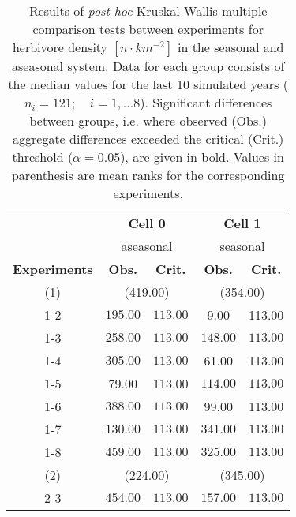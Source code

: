 \begin{table}[ht]
\centering
\small
\caption[Kruskal-Wallis multiple comparison of herbivore density.]{Results of \textit{post-hoc} Kruskal-Wallis multiple comparison
                            tests between experiments for herbivore density $[n\cdot km^{-2}]$ in the seasonal and aseasonal system.
                            Data for each group consists of the median values for the last 10 simulated years ($n_{i} = 121;\quad i = 1,\ldots8$).
                            Significant differences between groups, i.e. where observed (Obs.) aggregate differences exceeded the critical (Crit.) threshold ($\alpha = 0.05$), are given in bold. Values in parenthesis are mean ranks for the corresponding experiments.} 
\label{tab:chap:res:dyn:herbIND}
\begin{tabular*}{\textwidth}{@{\extracolsep{\fill} }ccccc}
  \toprule
& \multicolumn{2}{c}{\textbf{Cell 0}} & \multicolumn{2}{c}{\textbf{Cell 1}} \\
& \multicolumn{2}{c}{aseasonal} & \multicolumn{2}{c}{seasonal} \\
\cmidrule(lr){2-3} \cmidrule(lr){4-5}
\textbf{Experiments} & \textbf{Obs.} & \textbf{Crit.} & \textbf{Obs.} & \textbf{Crit.} \\
  \midrule
  (1) & \multicolumn{2}{c}{(419.00)} & \multicolumn{2}{c}{(354.00)} \\
1-2 & \(\mathbf{195.00}\) & \(\mathbf{113.00}\) & 9.00 & 113.00 \\ 
  1-3 & \(\mathbf{258.00}\) & \(\mathbf{113.00}\) & \(\mathbf{148.00}\) & \(\mathbf{113.00}\) \\ 
  1-4 & \(\mathbf{305.00}\) & \(\mathbf{113.00}\) & 61.00 & 113.00 \\ 
  1-5 & 79.00 & 113.00 & \(\mathbf{114.00}\) & \(\mathbf{113.00}\) \\ 
  1-6 & \(\mathbf{388.00}\) & \(\mathbf{113.00}\) & 99.00 & 113.00 \\ 
  1-7 & \(\mathbf{130.00}\) & \(\mathbf{113.00}\) & \(\mathbf{341.00}\) & \(\mathbf{113.00}\) \\ 
  1-8 & \(\mathbf{459.00}\) & \(\mathbf{113.00}\) & \(\mathbf{325.00}\) & \(\mathbf{113.00}\) \\ 
   [1ex]
(2) & \multicolumn{2}{c}{(224.00)} & \multicolumn{2}{c}{(345.00)} \\   
   2-3 & \(\mathbf{454.00}\) & \(\mathbf{113.00}\) & \(\mathbf{157.00}\) & \(\mathbf{113.00}\) \\ 

\end{tabular*}
\end{table}
